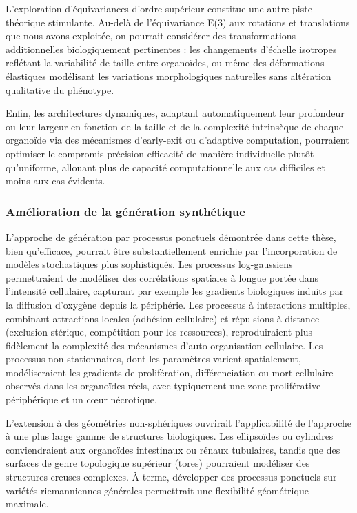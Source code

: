 L'exploration d'équivariances d'ordre supérieur constitue une autre piste théorique stimulante. Au-delà de l'équivariance E(3) aux rotations et translations que nous avons exploitée, on pourrait considérer des transformations additionnelles biologiquement pertinentes : les changements d'échelle isotropes reflétant la variabilité de taille entre organoïdes, ou même des déformations élastiques modélisant les variations morphologiques naturelles sans altération qualitative du phénotype.

Enfin, les architectures dynamiques, adaptant automatiquement leur profondeur ou leur largeur en fonction de la taille et de la complexité intrinsèque de chaque organoïde via des mécanismes d'early-exit ou d'adaptive computation, pourraient optimiser le compromis précision-efficacité de manière individuelle plutôt qu'uniforme, allouant plus de capacité computationnelle aux cas difficiles et moins aux cas évidents.

\subsubsection{Amélioration de la génération synthétique}

L'approche de génération par processus ponctuels démontrée dans cette thèse, bien qu'efficace, pourrait être substantiellement enrichie par l'incorporation de modèles stochastiques plus sophistiqués. Les processus log-gaussiens permettraient de modéliser des corrélations spatiales à longue portée dans l'intensité cellulaire, capturant par exemple les gradients biologiques induits par la diffusion d'oxygène depuis la périphérie. Les processus à interactions multiples, combinant attractions locales (adhésion cellulaire) et répulsions à distance (exclusion stérique, compétition pour les ressources), reproduiraient plus fidèlement la complexité des mécanismes d'auto-organisation cellulaire. Les processus non-stationnaires, dont les paramètres varient spatialement, modéliseraient les gradients de prolifération, différenciation ou mort cellulaire observés dans les organoïdes réels, avec typiquement une zone proliférative périphérique et un cœur nécrotique.

L'extension à des géométries non-sphériques ouvrirait l'applicabilité de l'approche à une plus large gamme de structures biologiques. Les ellipsoïdes ou cylindres conviendraient aux organoïdes intestinaux ou rénaux tubulaires, tandis que des surfaces de genre topologique supérieur (tores) pourraient modéliser des structures creuses complexes. À terme, développer des processus ponctuels sur variétés riemanniennes générales permettrait une flexibilité géométrique maximale.

